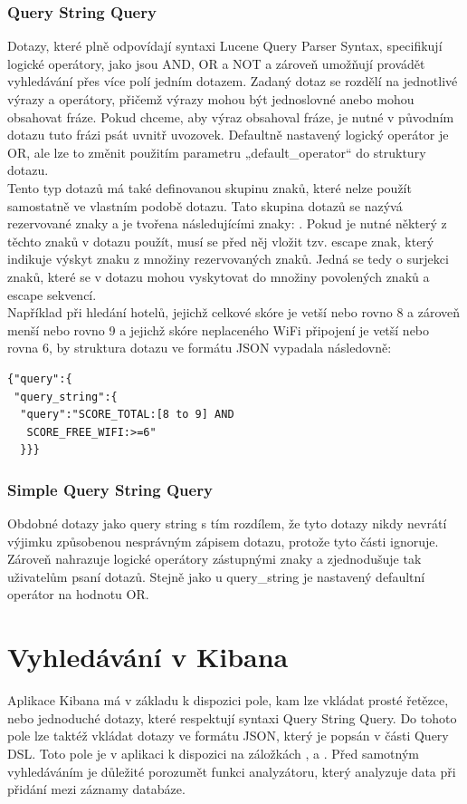\documentclass[czech,BP]{thesiskiv}
\begin{document}
\subsubsection{Query String Query}
Dotazy, které plně odpovídají syntaxi Lucene Query Parser Syntax, specifikují logické operátory, jako jsou AND, OR a NOT a zároveň umožňují provádět vyhledávání přes více polí jedním dotazem. Zadaný dotaz se rozdělí na jednotlivé výrazy a operátory, přičemž výrazy mohou být jednoslovné anebo mohou obsahovat fráze. Pokud chceme, aby výraz obsahoval fráze, je nutné v původním dotazu tuto frázi psát uvnitř uvozovek. Defaultně nastavený logický operátor je OR, ale lze to změnit použitím parametru „default\_operator“ do struktury dotazu.
\\
Tento typ dotazů má také definovanou skupinu znaků, které nelze použít samostatně ve vlastním podobě dotazu. Tato skupina dotazů se nazývá rezervované znaky a je tvořena následujícími znaky: . Pokud je nutné některý z těchto znaků v dotazu použít, musí se před něj vložit tzv. escape znak, který indikuje výskyt znaku z množiny rezervovaných znaků. Jedná se tedy o surjekci znaků, které se v dotazu mohou vyskytovat do množiny povolených znaků a escape sekvencí.
\\
Například při hledání hotelů, jejichž celkové skóre je vetší nebo rovno 8 a zároveň menší nebo rovno 9 a jejichž skóre neplaceného WiFi připojení je vetší nebo rovna 6, by struktura dotazu ve formátu JSON vypadala následovně:

\begin{lstlisting}[xleftmargin=0.2\textwidth]
{"query":{
 "query_string":{
  "query":"SCORE_TOTAL:[8 to 9] AND 
   SCORE_FREE_WIFI:>=6"
  }}}
\end{lstlisting}

	
\subsubsection{Simple Query String Query}
Obdobné dotazy jako query string s tím rozdílem, že tyto dotazy nikdy nevrátí výjimku způsobenou nesprávným zápisem dotazu, protože tyto části ignoruje. Zároveň nahrazuje logické operátory zástupnými znaky a zjednodušuje tak uživatelům psaní dotazů.  Stejně jako u query\_string je nastavený defaultní operátor na hodnotu OR.

\section{Vyhledávání v Kibana}
Aplikace Kibana má v základu k dispozici pole, kam lze vkládat prosté řetězce, nebo  jednoduché dotazy, které respektují syntaxi Query String Query. Do tohoto pole lze taktéž vkládat dotazy ve formátu JSON, který je popsán v části Query DSL. Toto pole je v aplikaci k dispozici na záložkách ,  a . Před samotným vyhledáváním je důležité porozumět funkci analyzátoru, který analyzuje data při přidání mezi záznamy databáze.
\end{document}
